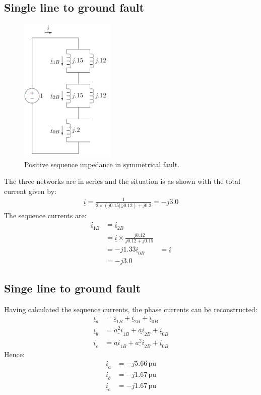 \subsection{Single line to ground fault}
\begin{figure}[H]
	\centering
	\includegraphics[width = 0.4\textwidth]{./img/figure42.png}
	\caption{Positive sequence impedance in symmetrical fault.}
\end{figure}
The three networks are in series and the situation is as shown with the total current given by:
\begin{gather}
	\underline{i} = \frac{1}{2 \times \left(j0.15 || j0.12\right) + j0.2} = -j3.0
\end{gather}
The sequence currents are:
\begin{align}
	\underline{i}_{1B} & = \underline{i}_{2B}                               \\
	                   & = \underline{i} \times \frac{j0.12}{j0.12 + j0.15} \\
	                   & = -j1.33
	\underline{i}_{0B} & = \underline{i}                                    \\
	                   & = -j3.0
\end{align}
\subsection{Singe line to ground fault}
Having calculated the sequence currents, the phase currents can be reconstructed:
\begin{align}
	\underline{i}_a & = \underline{i}_{1B} + \underline{i}_{2B} + \underline{i}_{0B}     \\
	\underline{i}_b & = \underline{a^2i}_{1B} + \underline{ai}_{2B} + \underline{i}_{0B} \\
	\underline{i}_c & = \underline{ai}_{1B} + \underline{a^2i}_{2B} + \underline{i}_{0B}
\end{align}
Hence:
\begin{align}
	\underline{i}_a & = -j5.66\, \textrm{pu} \\
	\underline{i}_b & = -j1.67\, \textrm{pu} \\
	\underline{i}_c & = -j1.67\, \textrm{pu}
\end{align}
